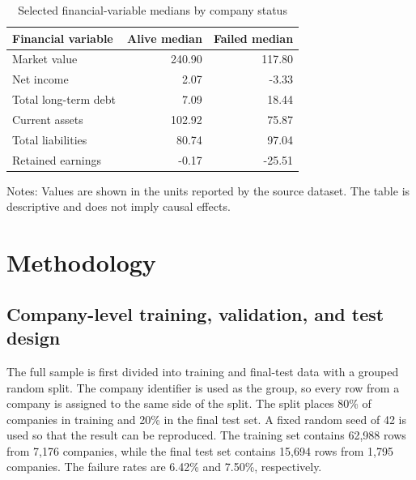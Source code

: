 \documentclass[11pt,a4paper]{article}
\begin{document}
\begin{table}[H]
  \centering
  \caption{Selected financial-variable medians by company status}
  \label{tab:financial-medians}
  \begin{threeparttable}
    \begin{tabular}{lrr}
      \toprule
      Financial variable & Alive median & Failed median \\
      \midrule
      Market value         & 240.90 & 117.80 \\
      Net income           &   2.07 &  -3.33 \\
      Total long-term debt &   7.09 &  18.44 \\
      Current assets       & 102.92 &  75.87 \\
      Total liabilities    &  80.74 &  97.04 \\
      Retained earnings    &  -0.17 & -25.51 \\
      \bottomrule
    \end{tabular}
    \begin{tablenotes}[flushleft]
      \footnotesize
      \item Notes: Values are shown in the units reported by the source
      dataset. The table is descriptive and does not imply causal effects.
    \end{tablenotes}
  \end{threeparttable}
\end{table}

\section{Methodology}
\label{sec:methodology}

\subsection{Company-level training, validation, and test design}

The full sample is first divided into training and final-test data with a
grouped random split. The company identifier is used as the group, so every row
from a company is assigned to the same side of the split. The split places 80\%
of companies in training and 20\% in the final test set. A fixed random seed of
42 is used so that the result can be reproduced. The training set contains
62,988 rows from 7,176 companies, while the final test set contains 15,694 rows
from 1,795 companies. The failure rates are 6.42\% and 7.50\%, respectively.
\end{document}
